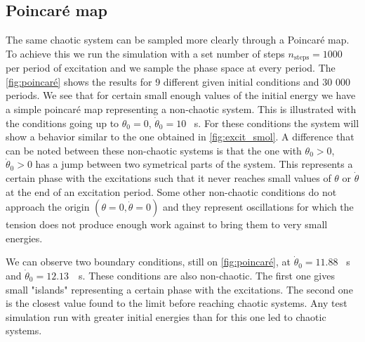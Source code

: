 \subsection{Poincaré map}
The same chaotic system can be sampled more clearly through a Poincaré map. To achieve this we run the simulation with a set number of steps $n_\mathrm{steps} = 1000$ per period of excitation and we sample the phase space at every period. The \autoref{fig:poincaré} shows the results for 9 different given initial conditions and 30 000 periods. We see that for certain small enough values of the initial energy we have a simple poincaré map representing a non-chaotic system. This is illustrated with the conditions going up to $\theta_0=0$, $\dot\theta_0=10$ \si{\per\second}. For these conditions the system will show a behavior similar to the one obtained in \autoref{fig:excit_smol}. A difference that can be noted between these non-chaotic systems is that the one with $\theta_0 > 0$, $\dot\theta_0 > 0$ has a jump between two symetrical parts of the system. This represents a certain phase with the excitations such that it never reaches small values of $\theta$ or $\dot\theta$ at the end of an excitation period. Some other non-chaotic conditions do not approach the origin $(\theta = 0, \dot\theta = 0)$ and they represent oscillations for which the tension does not produce enough work against to bring them to very small energies.

We can observe two boundary conditions, still on \autoref{fig:poincaré}, at $\dot\theta_0=11.88$ \si{\per\second} and \mbox{$\dot\theta_0=12.13$ \si{\per\second}}. These conditions are also non-chaotic. The first one gives small "islands" representing a certain phase with the excitations. The second one is the closest value found to the limit before reaching chaotic systems. Any test simulation run with greater initial energies than for this one led to chaotic systems.

